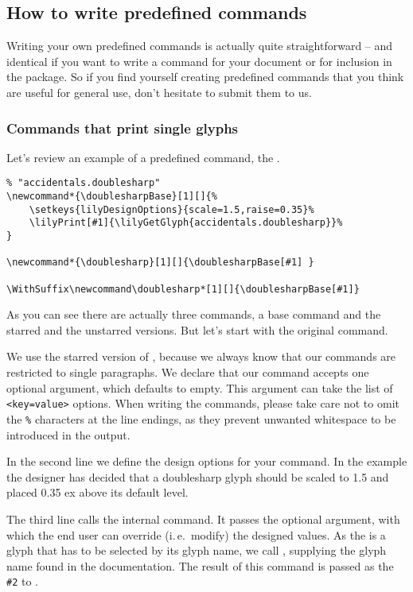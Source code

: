 \documentclass{article}
\begin{document}
\subsection{How to write predefined commands}
\label{subsec:howto_predefined_commands}
Writing your own predefined commands is actually quite straightforward -- and identical if you want to write a command for your document or for inclusion in the package.
So if you find yourself creating predefined commands that you think are useful for general use, don't hesitate to submit them to us. 

\subsubsection{Commands that print single glyphs}
\label{subsubsec:commands_single-glyphs}
Let's review an example of a predefined command, the .

\begin{verbatim}
% "accidentals.doublesharp"
\newcommand*{\doublesharpBase}[1][]{%
    \setkeys{lilyDesignOptions}{scale=1.5,raise=0.35}%
    \lilyPrint[#1]{\lilyGetGlyph{accidentals.doublesharp}}%
}

\newcommand*{\doublesharp}[1][]{\doublesharpBase[#1] }

\WithSuffix\newcommand\doublesharp*[1][]{\doublesharpBase[#1]}
\end{verbatim}
As you can see there are actually three commands, a base command and the starred and the unstarred versions.
But let's start with the original command.

We use the starred version of , because we always know that our commands are restricted to single paragraphs.
We declare that our command accepts one optional argument, which defaults to empty. 
This argument can take the list of \texttt{<key=value>} options.
When writing the commands, please take care not to omit the \texttt{\%} characters at the line endings, as they prevent unwanted whitespace to be introduced in the output.

In the second line we define the design options for your command.
In the example the designer has decided that a doublesharp glyph should be scaled to 1.5 and placed 0.35 ex above its default level.

The third line calls the internal  command. 
It passes the optional argument, with which the end user can override (i.\,e.\ modify) the designed values.
As the \doublesharp is a glyph that has to be selected by its glyph name, we call , supplying the glyph name found in the documentation.
The result of this command is passed as the \texttt{\#2} to .
\end{document}

